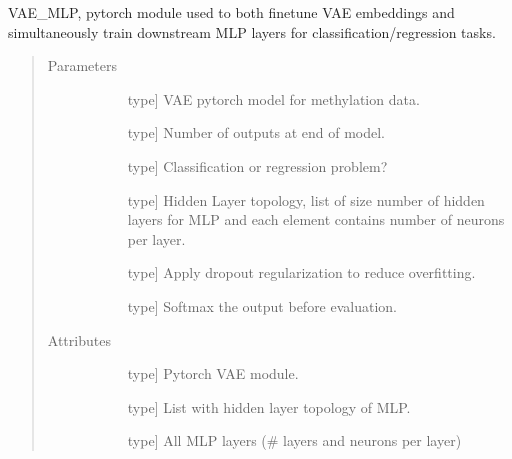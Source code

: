 \documentclass[letterpaper,10pt,english]{sphinxmanual}
\begin{document}
\begin{fulllineitems}
\label{\detokenize{index:methylnet.models.VAE_MLP}}
VAE\_MLP, pytorch module used to both finetune VAE embeddings and simultaneously train downstream MLP layers for classification/regression tasks.
\begin{quote}\begin{description}
\item[{Parameters}] \leavevmode\begin{description}
\item[{}] \leavevmode{[}type{]}
VAE pytorch model for methylation data.

\item[{}] \leavevmode{[}type{]}
Number of outputs at end of model.

\item[{}] \leavevmode{[}type{]}
Classification or regression problem?

\item[{}] \leavevmode{[}type{]}
Hidden Layer topology, list of size number of hidden layers for MLP and each element contains number of neurons per layer.

\item[{}] \leavevmode{[}type{]}
Apply dropout regularization to reduce overfitting.

\item[{}] \leavevmode{[}type{]}
Softmax the output before evaluation.

\end{description}

\item[{Attributes}] \leavevmode\begin{description}
\item[{}] \leavevmode{[}type{]}
Pytorch VAE module.

\item[{}] \leavevmode{[}type{]}
List with hidden layer topology of MLP.

\item[{}] \leavevmode{[}type{]}
All MLP layers (\# layers and neurons per layer)


\end{description}
\end{description}
\end{quote}
\end{fulllineitems}
\end{document}
